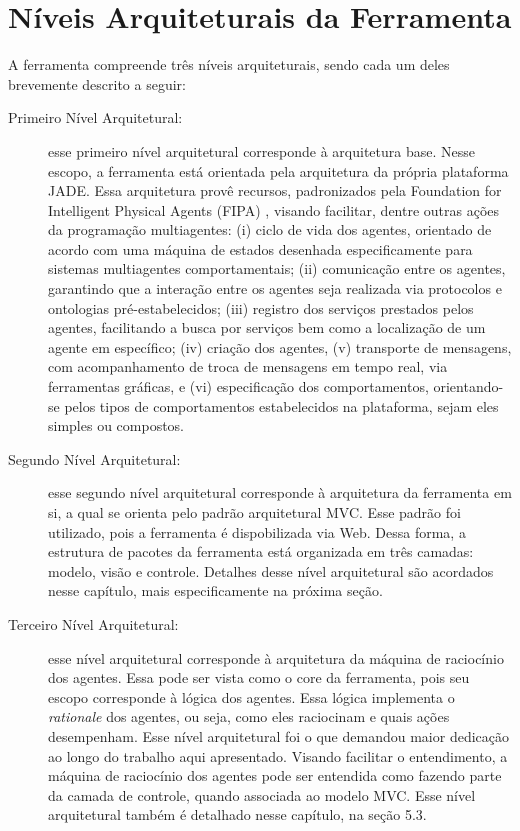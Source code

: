 \section{Níveis Arquiteturais da Ferramenta}
A ferramenta compreende três níveis arquiteturais, sendo cada um deles brevemente descrito a seguir:

\begin{description}
\item[Primeiro Nível Arquitetural:]
esse primeiro nível arquitetural corresponde à arquitetura base. Nesse escopo, a ferramenta está orientada pela arquitetura da própria plataforma JADE. Essa arquitetura provê recursos, padronizados pela Foundation for Intelligent Physical Agents (FIPA) \cite{telecon2014}, visando facilitar, dentre outras ações da programação multiagentes: (i) ciclo de vida dos agentes, orientado de acordo com uma máquina de estados desenhada especificamente para sistemas multiagentes comportamentais; (ii) comunicação entre os agentes, garantindo que a interação entre os agentes seja realizada via protocolos e ontologias pré-estabelecidos; (iii) registro dos serviços prestados pelos agentes, facilitando a busca por serviços bem como a localização de um agente em específico; (iv) criação dos agentes, (v) transporte de mensagens, com acompanhamento de troca de mensagens em tempo real, via ferramentas gráficas, e (vi) especificação dos comportamentos, orientando-se pelos tipos de comportamentos estabelecidos na plataforma, sejam eles simples ou compostos.

\item[Segundo Nível Arquitetural:]
esse segundo nível arquitetural corresponde à arquitetura da ferramenta em si, a qual se orienta pelo padrão arquitetural MVC. Esse padrão foi utilizado, pois a ferramenta é dispobilizada via Web. Dessa forma, a estrutura de pacotes da ferramenta está organizada em três camadas: modelo, visão e controle. Detalhes desse nível arquitetural são acordados nesse capítulo, mais especificamente na próxima seção.

\item[Terceiro Nível Arquitetural:]
esse nível arquitetural corresponde à arquitetura da máquina de raciocínio dos agentes. Essa pode ser vista como o core da ferramenta, pois seu escopo corresponde à lógica dos agentes. Essa lógica implementa o \textit{rationale} dos agentes, ou seja, como eles raciocinam e quais ações desempenham. Esse nível arquitetural foi o que demandou maior dedicação ao longo do trabalho aqui apresentado. Visando facilitar o entendimento, a máquina de raciocínio dos agentes pode ser entendida como fazendo parte da camada de controle, quando associada ao modelo MVC. Esse nível arquitetural também é detalhado nesse capítulo, na seção 5.3.

\end{description}

